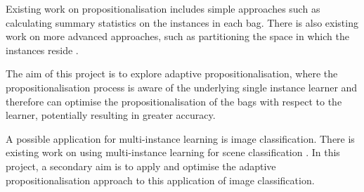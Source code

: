 \documentclass[a4paper,12pt,titlepage]{article} %
\begin{document}
Existing work on propositionalisation includes simple approaches such as calculating summary statistics on the instances in each bag. There is also existing work on more advanced approaches, such as partitioning the space in which the instances reside \cite{Weidmann2003}.

The aim of this project is to explore adaptive propositionalisation, where the propositionalisation process is aware of the underlying single instance learner and therefore can optimise the propositionalisation of the bags with respect to the learner, potentially resulting in greater accuracy.

A possible application for multi-instance learning is image classification. There is existing work on using multi-instance learning for scene classification \cite{MaronRatan1998}. In this project, a secondary aim is to apply and optimise the adaptive propositionalisation approach to this application of image classification.

 

\end{document}
